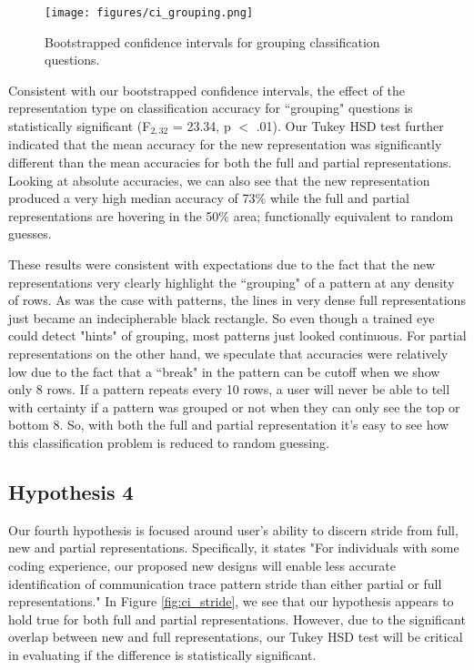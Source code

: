     \begin{figure}
        \centering
        \texttt{[image: figures/ci\_grouping.png]}
        \caption{Bootstrapped confidence intervals for grouping classification questions.}
        \label{fig:ci_grouping}
    \end{figure}
    
    Consistent with our bootstrapped confidence intervals, the effect of the representation type on classification accuracy for ``grouping" questions is statistically significant (F$_{2,32}$ = 23.34, p $<$ .01). Our Tukey HSD test further indicated that the mean accuracy for the new representation was significantly different than the mean accuracies for both the full and partial representations. Looking at absolute accuracies, we can also see that the new representation produced a very high median accuracy of 73\% while the full and partial representations are hovering in the 50\% area; functionally equivalent to random guesses. 
    
    These results were consistent with expectations due to the fact that the new representations very clearly highlight the ``grouping" of a pattern at any density of rows. As was the case with patterns, the lines in very dense full representations just became an indecipherable black rectangle. So even though a trained eye could detect "hints" of grouping, most patterns just looked continuous. For partial representations on the other hand, we speculate that accuracies were relatively low due to the fact that a ``break" in the pattern can be cutoff when we show only 8 rows. If a pattern repeats every 10 rows, a user will never be able to tell with certainty if a pattern was grouped or not when they can only see the top or bottom 8. So, with both the full and partial representation it's easy to see how this classification problem is reduced to random guessing.

\subsection{Hypothesis 4}
    Our fourth hypothesis is focused around user's ability to discern stride from full, new and partial representations. Specifically, it states "For individuals with some coding experience, our proposed new designs will enable less accurate identification of communication trace pattern stride than either partial or full representations." In Figure \ref{fig:ci_stride}, we see that our hypothesis appears to hold true for both full and partial representations. However, due to the significant overlap between new and full representations, our Tukey HSD test will be critical in evaluating if the difference is statistically significant.
    
